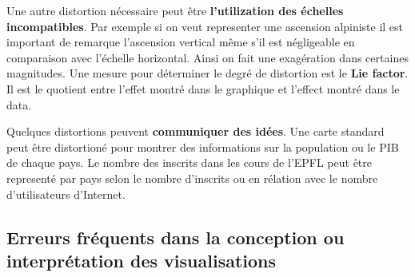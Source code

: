 Une autre distortion n\'ecessaire peut \^etre \textbf{l'utilization des \'echelles incompatibles}. Par exemple si on veut representer une ascension alpiniste il est important de remarque l'ascension vertical m\^eme s'il est n\'egligeable en comparaison avec l'\'echelle horizontal. Ainsi on fait une exag\'eration dans certaines magnitudes. Une mesure pour d\'eterminer le degr\'e de distortion est le \textbf{Lie factor}. Il est le quotient entre l'effet montr\'e dans le graphique et l'effect montr\'e dans le data. 

Quelques distortions peuvent \textbf{communiquer des id\'ees}. Une carte standard peut \^etre distortion\'e pour montrer des informations sur la population ou le PIB de chaque pays. Le nombre des inscrits dans les cours de l'EPFL peut \^etre represent\'e par pays selon le nombre d'inscrits ou en r\'elation avec le nombre d'utilisateurs d'Internet.

\subsection{Erreurs fr\'equents dans la conception ou interpr\'etation des visualisations}


